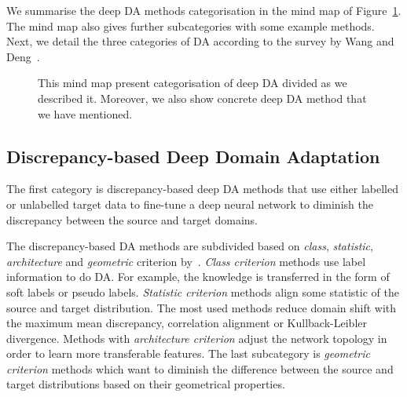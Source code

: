 We summarise the deep DA methods categorisation in the mind map of Figure~\ref{mind_map}.
The mind map also gives further subcategories with some example methods.
Next, we detail the three categories of DA according to the survey by Wang and Deng~\cite{wang2018}.

\begin{figure}
\caption[Mind map of deep domain adaptation]{
	This mind map present categorisation of deep DA divided as we described it.
	Moreover, we also show concrete deep DA method
	that we have mentioned.
}
\label{mind_map}
\end{figure}

\subsection{Discrepancy-based Deep Domain Adaptation}
\label{discrepancy_da}

The first category is discrepancy-based deep DA methods
that use either labelled or unlabelled target data
to fine-tune a deep neural network to diminish the discrepancy
between the source and target domains.

The discrepancy-based DA methods are subdivided based on \textit{class}, \textit{statistic}, \textit{architecture} and \textit{geometric} criterion by~\cite{wang2018}.
\textit{Class criterion} methods use label information to do DA.
For example, the knowledge is transferred in the form of soft labels or pseudo labels.
\textit{Statistic criterion} methods align some statistic of the source and target distribution.
The most used methods reduce domain shift with the maximum mean discrepancy, correlation alignment or Kullback-Leibler divergence.
Methods with \textit{architecture criterion} adjust the network topology in order to learn more transferable features.
The last subcategory is \textit{geometric criterion} methods
which want to diminish the difference between the source and target distributions based on their geometrical properties.

